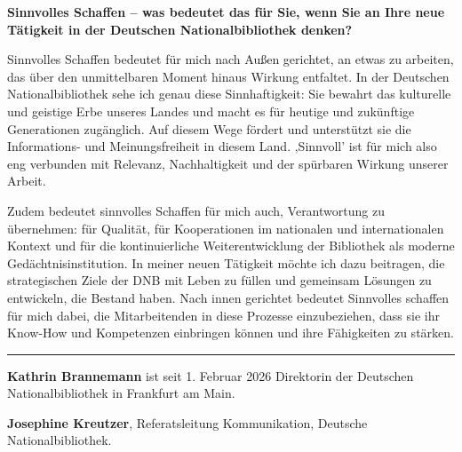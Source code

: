 \documentclass[a4paper,
fontsize=11pt,
oneside,
numbers=noperiodatend,
parskip=half-,
bibliography=totoc,
final
]{scrartcl}
\begin{document}
\textbf{Sinnvolles Schaffen -- was bedeutet das für Sie, wenn Sie an
Ihre neue Tätigkeit in der Deutschen Nationalbibliothek denken?}

Sinnvolles Schaffen bedeutet für mich nach Außen gerichtet, an etwas zu
arbeiten, das über den unmittelbaren Moment hinaus Wirkung entfaltet. In
der Deutschen Nationalbibliothek sehe ich genau diese Sinnhaftigkeit:
Sie bewahrt das kulturelle und geistige Erbe unseres Landes und macht es
für heutige und zukünftige Generationen zugänglich. Auf diesem Wege
fördert und unterstützt sie die Informations- und Meinungsfreiheit in
diesem Land. ‚Sinnvoll' ist für mich also eng verbunden mit Relevanz,
Nachhaltigkeit und der spürbaren Wirkung unserer Arbeit.

Zudem bedeutet sinnvolles Schaffen für mich auch, Verantwortung zu
übernehmen: für Qualität, für Kooperationen im nationalen und
internationalen Kontext und für die kontinuierliche Weiterentwicklung
der Bibliothek als moderne Gedächtnisinstitution. In meiner neuen
Tätigkeit möchte ich dazu beitragen, die strategischen Ziele der DNB mit
Leben zu füllen und gemeinsam Lösungen zu entwickeln, die Bestand haben.
Nach innen gerichtet bedeutet Sinnvolles schaffen für mich dabei, die
Mitarbeitenden in diese Prozesse einzubeziehen, dass sie ihr Know-How
und Kompetenzen einbringen können und ihre Fähigkeiten zu stärken.

\begin{center}\rule{0.5\linewidth}{0.5pt}\end{center}

\textbf{Kathrin Brannemann} ist
seit 1. Februar 2026 Direktorin der Deutschen Nationalbibliothek in
Frankfurt am Main.

\textbf{Josephine Kreutzer}, Referatsleitung Kommunikation, Deutsche
Nationalbibliothek.
\end{document}

